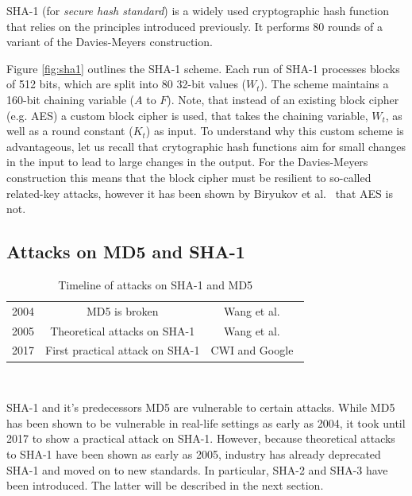 SHA-1 (for \emph{secure hash standard}) is a widely used cryptographic hash function that relies on the principles introduced previously.
It performs 80 rounds of a variant of the Davies-Meyers construction.

Figure \ref{fig:sha1} outlines the SHA-1 scheme. Each run of SHA-1 processes blocks of 512 bits, which are split into 80 32-bit values ($W_t$).
The scheme maintains a 160-bit chaining variable ($A$ to $F$).
Note, that instead of an existing block cipher (e.g. AES) a custom block cipher is used, that takes the chaining variable, $W_t$, as well as a round constant ($K_t$) as input.
To understand why this custom scheme is advantageous, let us recall that crytographic hash functions aim for small changes in the input to lead to large changes in the output.
For the Davies-Meyers construction this means that the block cipher must be resilient to so-called related-key attacks, however it has been shown by Biryukov et al.~\cite{biryukov2009related} that AES is not. 

\subsection{Attacks on MD5 and SHA-1}
\begin{table}[htb]
\centering
    \begin{tabular}{|c|c|c|}
        \hline
        2004 & MD5 is broken & Wang et al.~\cite{wang2005break} \\
        2005 & Theoretical attacks on SHA-1 & Wang et al.~\cite{wang2005finding} \\
        2017 & First practical attack on SHA-1 & CWI and Google~\cite{stevens2017first} \\
        \hline
    \end{tabular} \\
    \caption{Timeline of attacks on SHA-1 and MD5}
\end{table}

SHA-1 and it's predecessors MD5 are vulnerable to certain attacks.
While MD5 has been shown to be vulnerable in real-life settings as early as 2004, it took until 2017 to show a practical attack on SHA-1.
However, because theoretical attacks to SHA-1 have been shown as early as 2005, industry has already deprecated SHA-1 and moved on to new standards.
In particular, SHA-2 and SHA-3 have been introduced. The latter will be described in the next section.


